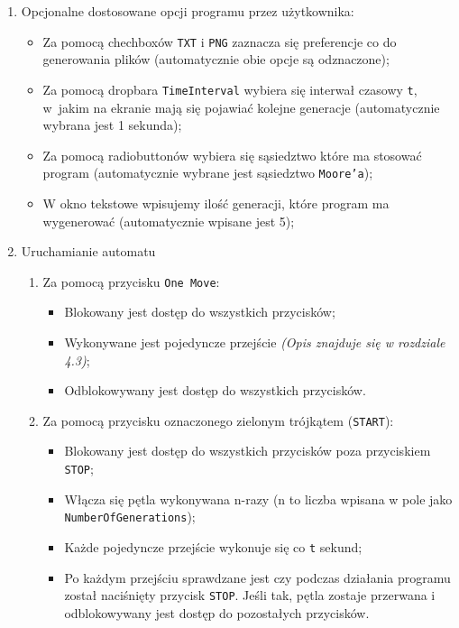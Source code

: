 \documentclass[a4paper,12pt]{article}
\begin{document}
\begin{enumerate}
\begin{itemize}
	\end{itemize}
\item Opcjonalne dostosowane opcji programu przez użytkownika:
	\begin{itemize}
		\item Za pomocą chechboxów \texttt {TXT} i \texttt {PNG} zaznacza się preferencje co do generowania plików (automatycznie obie opcje są odznaczone);
		\item Za pomocą dropbara \texttt{TimeInterval} wybiera się interwał czasowy \texttt{t}, w~jakim na ekranie mają się pojawiać kolejne generacje (automatycznie wybrana jest 1 sekunda);
		\item Za pomocą radiobuttonów wybiera się sąsiedztwo które ma stosować program (automatycznie wybrane jest sąsiedztwo \texttt {Moore’a});
		\item W okno tekstowe wpisujemy ilość generacji, które program ma wygenerować (automatycznie wpisane jest 5);
	\end{itemize}
\item Uruchamianie automatu
	\begin{enumerate}
	\item Za pomocą przycisku \texttt{One Move}:
		\begin{itemize}
			\item Blokowany jest dostęp do wszystkich przycisków;
			\item Wykonywane jest pojedyncze przejście \textit{(Opis znajduje się w rozdziale 4.3)};
			\item Odblokowywany jest dostęp do wszystkich przycisków.
		\end{itemize}
	\item Za pomocą przycisku oznaczonego zielonym trójkątem (\texttt{START}):
		\begin{itemize}
			\item Blokowany jest dostęp do wszystkich przycisków poza przyciskiem \texttt{STOP};
			\item Włącza się pętla wykonywana n-razy (n to liczba wpisana w pole jako \texttt{NumberOfGenerations});
			\item Każde pojedyncze przejście wykonuje się co \texttt{t} sekund;
			\item Po każdym przejściu sprawdzane jest czy podczas działania programu został naciśnięty przycisk \texttt {STOP}. Jeśli tak, pętla zostaje przerwana i odblokowywany jest dostęp do pozostałych przycisków.
		\end{itemize}
	\end{enumerate}
\end{enumerate}
\end{document}
